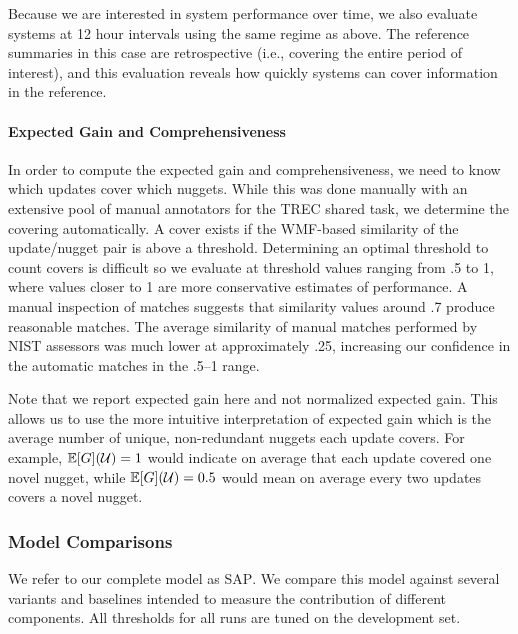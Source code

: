 Because we are interested in system performance over time, we also evaluate
systems at 12 hour intervals using the same regime as above. The reference
summaries in this case are retrospective (i.e., covering the entire period of
interest), and this evaluation reveals how quickly systems can cover
information in the reference.

\paragraph{Expected Gain and Comprehensiveness}

In order to compute the expected gain and comprehensiveness, we need to know
which updates cover which nuggets. While this was done manually with an
extensive pool of manual annotators for the TREC shared task, we determine the
covering automatically.  A cover exists if the WMF-based similarity of the
update/nugget pair is above a threshold.  Determining an optimal threshold to
count covers is difficult so we evaluate at threshold values ranging from .5 to
1, where values closer to 1 are more conservative estimates of performance.  A
manual inspection of matches suggests that similarity values around .7 produce
reasonable matches.  The average similarity of manual matches performed by NIST
assessors was much lower at approximately .25, increasing our confidence in the
automatic matches in the .5--1 range.

Note that we report expected gain here and not normalized expected gain.  This
allows us to use the more intuitive interpretation of expected gain which is
the average number of unique, non-redundant nuggets each update covers. For
example, $\mathbb{E}[G](\mathcal{U})=1$ would indicate on average that each update
covered one novel nugget, while $\mathbb{E}[G](\mathcal{U})=0.5$ would mean on average
every two updates covers a novel nugget.

\subsubsection{Model Comparisons}

We refer to our complete model as \textsc{SAP}.  We compare this model against
several variants and baselines intended to measure the contribution of
different components. All thresholds for all runs are tuned on the development
set.


